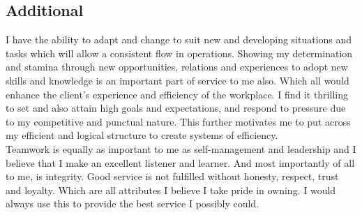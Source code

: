 \documentclass[11pt, english]{article}
\begin{document}
{\subsection{Additional}

I have the ability to adapt and change to suit new and developing situations and tasks which will allow a consistent flow in operations. Showing my determination and stamina through new opportunities, relations and experiences to adopt new skills and knowledge is an important part of service to me also. Which all would enhance the client’s experience and efficiency of the workplace. I find it thrilling to set and also attain high goals and expectations, and respond to pressure due to my competitive and punctual nature. This further motivates me to put across my efficient and logical structure to create systems of efficiency.\\

Teamwork is equally as important to me as self-management and leadership and I believe that I make an excellent listener and learner. And most importantly of all to me, is integrity. Good service is not fulfilled without honesty, respect, trust and loyalty. Which are all attributes I believe I take pride in owning. I would always use this to provide the best service I possibly could.

}
\end{document}
